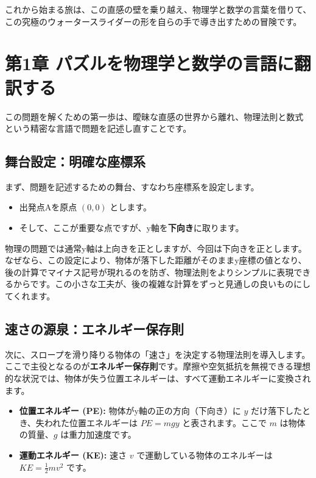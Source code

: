 \documentclass[12pt,a4paper]{ltjsarticle}
\begin{document}
これから始まる旅は、この直感の壁を乗り越え、物理学と数学の言葉を借りて、この究極のウォータースライダーの形を自らの手で導き出すための冒険です。

\section{第1章 パズルを物理学と数学の言語に翻訳する}

この問題を解くための第一歩は、曖昧な直感の世界から離れ、物理法則と数式という精密な言語で問題を記述し直すことです。

\subsection{舞台設定：明確な座標系}

まず、問題を記述するための舞台、すなわち座標系を設定します。

\begin{itemize}
\item 出発点Aを原点 $(0,0)$ とします。
\item そして、ここが重要な点ですが、y軸を\textbf{下向き}に取ります。
\end{itemize}

物理の問題では通常y軸は上向きを正としますが、今回は下向きを正とします。なぜなら、この設定により、物体が落下した距離がそのままy座標の値となり、後の計算でマイナス記号が現れるのを防ぎ、物理法則をよりシンプルに表現できるからです。この小さな工夫が、後の複雑な計算をずっと見通しの良いものにしてくれます。

\subsection{速さの源泉：エネルギー保存則}

次に、スロープを滑り降りる物体の「速さ」を決定する物理法則を導入します。ここで主役となるのが\textbf{エネルギー保存則}です。摩擦や空気抵抗を無視できる理想的な状況では、物体が失う位置エネルギーは、すべて運動エネルギーに変換されます。

\begin{itemize}
\item \textbf{位置エネルギー (PE):} 物体がy軸の正の方向（下向き）に $y$ だけ落下したとき、失われた位置エネルギーは $PE = mgy$ と表されます。ここで $m$ は物体の質量、$g$ は重力加速度です。
\item \textbf{運動エネルギー (KE):} 速さ $v$ で運動している物体のエネルギーは $KE = \frac{1}{2}mv^2$ です。
\end{itemize}
\end{document}
